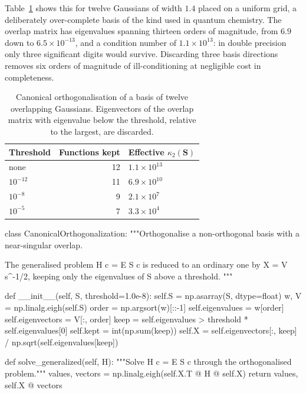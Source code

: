 Table~\ref{tab:canonical} shows this for twelve Gaussians of width $1.4$
placed on a uniform grid, a deliberately over-complete basis of the kind used
in quantum chemistry.  The overlap matrix has eigenvalues spanning thirteen
orders of magnitude, from $6.9$ down to $6.5\times10^{-13}$, and a condition
number of $1.1\times10^{13}$: in double precision only three significant
digits would survive.  Discarding three basis directions removes six orders
of magnitude of ill-conditioning at negligible cost in completeness.

\begin{table}[h]
\centering
\renewcommand{\arraystretch}{1.25}
\setlength{\tabcolsep}{10pt}
\begin{tabular}{lrl}
\toprule
\textbf{Threshold} & \textbf{Functions kept} &
\textbf{Effective $\kappa_2(\bm{S})$}\\
\midrule
none        & 12 & $1.1\times10^{13}$\\
$10^{-12}$  & 11 & $6.9\times10^{10}$\\
$10^{-8}$   &  9 & $2.1\times10^{7}$\\
$10^{-5}$   &  7 & $3.3\times10^{4}$\\
\bottomrule
\end{tabular}
\caption{Canonical orthogonalisation of a basis of twelve overlapping
Gaussians.  Eigenvectors of the overlap matrix with eigenvalue below the
threshold, relative to the largest, are discarded.}
\label{tab:canonical}
\end{table}

\begin{Python}{}
class CanonicalOrthogonalization:
    """Orthogonalise a non-orthogonal basis with a near-singular overlap.

    The generalised problem H c = E S c is reduced to an ordinary one by
    X = V s^{-1/2}, keeping only the eigenvalues of S above a threshold.
    """

    def __init__(self, S, threshold=1.0e-8):
        self.S = np.asarray(S, dtype=float)
        w, V = np.linalg.eigh(self.S)
        order = np.argsort(w)[::-1]
        self.eigenvalues = w[order]
        self.eigenvectors = V[:, order]
        keep = self.eigenvalues > threshold * self.eigenvalues[0]
        self.kept = int(np.sum(keep))
        self.X = self.eigenvectors[:, keep] / np.sqrt(self.eigenvalues[keep])

    def solve_generalized(self, H):
        """Solve H c = E S c through the orthogonalised problem."""
        values, vectors = np.linalg.eigh(self.X.T @ H @ self.X)
        return values, self.X @ vectors
\end{Python}

